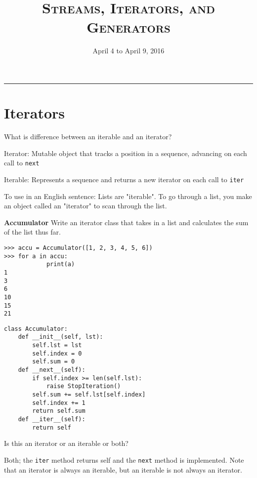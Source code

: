 \documentclass{exam}
\title{\textsc{Streams, Iterators, and Generators}}
\date{April 4 to April 9, 2016}
\begin{document}
\maketitle
\rule{\textwidth}{0.15em}
\fontsize{12}{15}\selectfont


\section{Iterators}
\begin{questions}
\begin{blocksection}
\question What is difference between an iterable and an iterator?
\begin{solution}[0.5in]
Iterator: Mutable object that tracks a position in a sequence, advancing on each call to \texttt{next} 

Iterable: Represents a sequence and returns a new iterator on each call to \texttt{iter}

To use in an English sentence:
Lists are "iterable". To go through a list, you make an object called an "iterator" to scan through the list.
\end{solution}
\end{blocksection}

\begin{blocksection}
\question \textbf{Accumulator} Write an iterator class that takes in a list and calculates the sum of the list thus far.
\begin{lstlisting}
>>> accu = Accumulator([1, 2, 3, 4, 5, 6])
>>> for a in accu:
            print(a)
1
3
6
10
15
21
\end{lstlisting}

\begin{solution}[1.5in]
\begin{lstlisting}
class Accumulator:
	def __init__(self, lst):
		self.lst = lst
		self.index = 0
		self.sum = 0
	def __next__(self):
		if self.index >= len(self.lst):
			raise StopIteration()
		self.sum += self.lst[self.index]
		self.index += 1
		return self.sum
	def __iter__(self):
		return self
\end{lstlisting}
\end{solution}
\end{blocksection}

\begin{blocksection}
\question Is this an iterator or an iterable or both?
\begin{solution}[0.5in]
Both; the \texttt{iter} method returns self and the \texttt{next} method is implemented. Note that an iterator is always an iterable, but an iterable is not always an iterator.
\end{solution}


\end{blocksection}
\end{questions}
\end{document}
